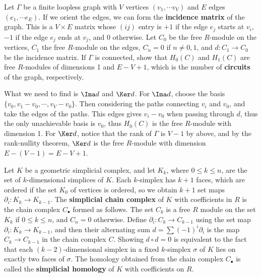 \begin{exer} Let $\Gamma$ be a finite loopless graph with $V$ vertices $(v_1,\cdots v_V)$ and $E$ edges $(e_1,\cdots e_E)$. If we orient the edges, we can form the \textbf{incidence matrix} of the graph. This is a $V\times E$ matrix whose $(ij)$ entry is $+1$ if the edge $e_j$ starts at $v_i$, $-1$ if the edge $e_j$ ends at $v_j$, and $0$ otherwise. Let $C_0$ be the free $R$-module on the vertices, $C_1$ the free $R$-module on the edges, $C_n=0$ if $n\neq 0,1$, and $d:C_1\rightarrow C_0$ be the incidence matrix. If $\Gamma$ is connected, show that $H_0(C)$ and $H_1(C)$ are free $R$-modules of dimensions 1 and $E-V+1$, which is the number of \textbf{circuits} of the graph, respectively.
\end{exer}
\begin{solution} What we need to find is $\Ima d$ and $\Ker d$. For $\Ima d$, choose the basis $\{v_0,v_1-v_0,\cdots,v_V-v_0\}$. Then considering the paths connecting $v_i$ and $v_0$, and take the edges of the paths. This edges gives $v_i-v_0$ when passing through $d$, thus the only unachievable basis is $v_0$, thus $H_0(C)$ is the free $R$-module with dimension 1. For $\Ker d$, notice that the rank of $\Gamma$ is $V-1$ by above, and by the rank-nullity theorem, $\Ker d$ is the free $R$-module with dimension $E-(V-1)=E-V+1$.
\end{solution}

\begin{exmp} Let $K$ be a geometric simplicial complex, and let $K_k$, where $0\leq k\leq n$, are the set of $k$-dimensional simplices of $K$. Each $k$-simplex has $k+1$ faces, which are ordered if the set $K_0$ of vertices is ordered, so we obtain $k+1$ set maps $\partial_i:K_k\rightarrow K_{k-1}$. The \textbf{simplicial chain complex} of $K$ with coefficients in $R$ is the chain complex $C_\bullet$ formed as follows. The set $C_k$ is a free $R$ module on the set $K_k$ if $0\leq k\leq n$, and $C_n=0$ otherwise. Define $\partial_i:C_k\rightarrow C_{k-1}$ using the set map $\partial_i:K_k\rightarrow K_{k-1}$, and then their alternating sum $d=\sum(-1)^i\partial_i$ is the map $C_k\rightarrow C_{k-1}$ in the chain complex $C$. Showing $d\circ d=0$ is equivalent to the fact that each $(k-2)$-dimensional simplex in a fixed $k$-simplex $\sigma$ of $K$ lies on exactly two faces of $\sigma$. The homology obtained from the chain complex $C_\bullet$ is called the \textbf{simplicial homology} of $K$ with coefficients on $R$.
\end{exmp}

